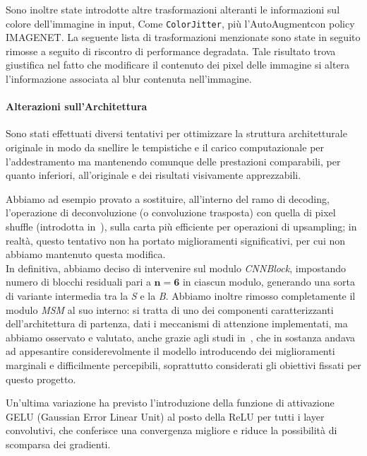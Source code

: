 \documentclass[a4paper,10pt,twocolumn]{article}
\begin{document}
Sono inoltre state introdotte altre trasformazioni alteranti le informazioni sul colore dell'immagine in input, Come \texttt{ColorJitter},
pi\`u l'AutoAugment\cite{cubuk2019autoaugmentlearningaugmentationpolicies}con policy IMAGENET. La seguente lista di trasformazioni menzionate sono state in seguito rimosse a seguito di riscontro di performance degradata.
Tale risultato trova giustifica nel fatto che modificare il contenuto dei pixel delle immagine si altera l'informazione associata al blur contenuta nell'immagine.

\paragraph{Alterazioni sull'Architettura}
Sono stati effettuati diversi tentativi per ottimizzare la struttura architetturale originale in modo da snellire le tempistiche e il carico computazionale per l'addestramento ma mantenendo comunque delle
prestazioni comparabili, per quanto inferiori, all'originale e dei risultati visivamente apprezzabili.

Abbiamo ad esempio provato a sostituire, all'interno del ramo di decoding, l'operazione di deconvoluzione (o convoluzione trasposta) con quella di pixel shuffle (introdotta in~\cite{shi2016realtimesingleimagevideo}), 
sulla carta più efficiente per operazioni di upsampling; in realtà, questo tentativo non ha portato miglioramenti significativi, per cui non abbiamo mantenuto questa modifica. \\
In definitiva, abbiamo deciso di intervenire sul modulo \textit{CNNBlock}, impostando numero di blocchi residuali pari a \(\mathbf{n=6}\) in ciascun modulo, generando una sorta di variante intermedia tra la \textit{S} 
e la \textit{B}. Abbiamo inoltre rimosso completamente il modulo \textit{MSM} al suo interno: si tratta di uno dei componenti caratterizzanti dell'architettura di partenza, dati i meccanismi di attenzione implementati,
ma abbiamo osservato e valutato, anche grazie agli studi in~\cite{convir}, che in sostanza andava ad appesantire considerevolmente il modello introducendo dei miglioramenti marginali e difficilmente percepibili,
soprattutto considerati gli obiettivi fissati per questo progetto.

Un'ultima variazione ha previsto l'introduzione della funzione di attivazione GELU (Gaussian Error Linear Unit) al posto della ReLU per tutti i layer convolutivi, che conferisce una convergenza migliore e riduce la 
possibilità di scomparsa dei gradienti.
\end{document}
